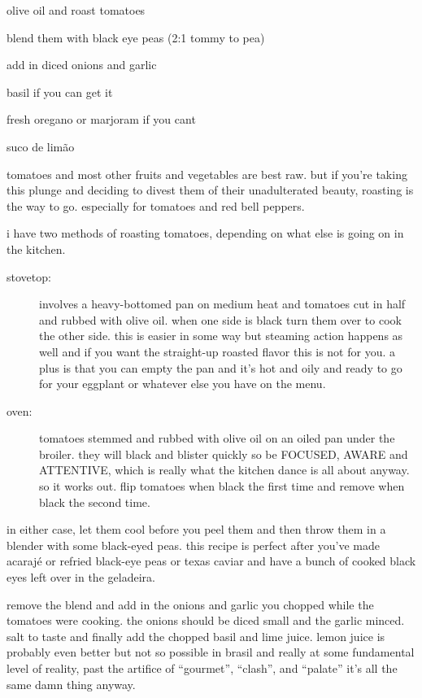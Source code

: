 \begin{ingredients}
  \item olive oil and roast tomatoes
  \item blend them with black eye peas (2:1 tommy to pea)
  \item add in diced onions and garlic
  \item basil if you can get it
  \item fresh oregano or marjoram if you cant
  \item suco de lim\~{a}o
\end{ingredients}

tomatoes and most other fruits and vegetables are best raw. but if
you're taking this plunge and deciding to divest them of their
unadulterated beauty, roasting is the way to go. especially for
tomatoes and red bell peppers.

i have two methods of roasting tomatoes, depending on what else is
going on in the kitchen.

\begin{description}
  \item[stovetop:] involves a heavy-bottomed pan on medium heat and
  tomatoes cut in half and rubbed with olive oil. when one side is
  black turn them over to cook the other side. this is easier in some
  way but steaming action happens as well and if you want the
  straight-up roasted flavor this is not for you. a plus is that you
  can empty the pan and it's hot and oily and ready to go for your
  eggplant or whatever else you have on the menu.

  \item[oven:] tomatoes stemmed and rubbed with olive oil on an oiled
  pan under the broiler. they will black and blister quickly so be
  FOCUSED, AWARE and ATTENTIVE, which is really what the kitchen dance
  is all about anyway. so it works out. flip tomatoes when black the
  first time and remove when black the second time.
\end{description}

in either case, let them cool before you peel them and then throw them
in a blender with some black-eyed peas. this recipe is perfect after
you've made acaraj\'{e} or refried black-eye peas or texas caviar and
have a bunch of cooked black eyes left over in the
\gls{geladeira}.

remove the blend and add in the onions and garlic you chopped while
the tomatoes were cooking. the onions should be diced small and the
garlic minced. salt to taste and finally add the chopped basil and
lime juice. lemon juice is probably even better but not so possible in
brasil and really at some fundamental level of reality, past the
artifice of ``gourmet'', ``clash'', and ``palate'' it's all the same
damn thing anyway.

